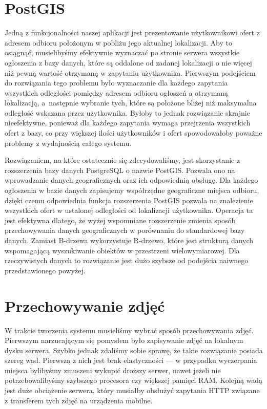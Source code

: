 \documentclass[licencjacka]{pracamgr}
\begin{document}
\section{PostGIS}
Jedną z funkcjonalności naszej aplikacji jest prezentowanie użytkownikowi ofert z adresem odbioru położonym w pobliżu jego aktualnej lokalizacji. Aby to osiągnąć, musielibyśmy efektywnie wyznaczać po stronie serwera wszystkie ogłoszenia z bazy danych, które są oddalone od zadanej lokalizacji o nie więcej niż pewną wartość otrzymaną w zapytaniu użytkownika. Pierwszym podejściem do rozwiązania tego problemu było wyznaczanie dla każdego zapytania wszystkich odległości pomiędzy adresem odbioru ogłoszeń a otrzymaną lokalizacją, a~następnie wybranie tych, które są położone bliżej niż maksymalna odległość wskazana przez użytkownika. Byłoby to jednak rozwiązanie skrajnie nieefektywne, ponieważ dla każdego zapytania wymaga przejrzenia wszystkich ofert z bazy, co przy większej ilości użytkowników i ofert spowodowałoby poważne problemy z wydajnością całego systemu.

Rozwiązaniem, na które ostatecznie się zdecydowaliśmy, jest skorzystanie z rozszerzenia bazy danych PostgreSQL o nazwie PostGIS\@. Pozwala ono na wprowadzanie danych geograficznych oraz ich odpowiednią obsługę. Dla każdego ogłoszenia w bazie danych zapisujemy współrzędne geograficzne miejsca odbioru, dzięki czemu odpowiednia funkcja rozszerzenia PostGIS pozwala na znalezienie wszystkich ofert w ustalonej odległości od lokalizacji użytkownika. Operacja ta jest efektywna dlatego, że wyżej wspomniane rozszerzenie zmienia sposób przechowywania danych geograficznych w porównaniu do standardowej bazy danych. Zamiast B-drzewa wykorzystuje R-drzewo, które jest strukturą danych wspomagającą wyszukiwanie obiektów w przestrzeni wielowymiarowej. Dla rzeczywistych danych to rozwiązanie jest dużo szybsze od podejścia naiwnego przedstawionego powyżej.

\section{Przechowywanie zdjęć}

W trakcie tworzenia systemu musieliśmy wybrać sposób przechowywania zdjęć. Pierwszym narzucającym się pomysłem było zapisywanie zdjęć na lokalnym dysku serwera. Szybko jednak zdaliśmy sobie sprawę, że takie rozwiązanie posiada szereg wad.
Pierwszą z nich jest brak elastyczności --- w przypadku wyczerpania miejsca bylibyśmy zmuszeni wykupić droższy serwer, nawet jeżeli nie potrzebowalibyśmy szybszego procesora czy większej pamięci RAM. Kolejną wadą jest duże obciążenie serwera, który musiałby obsłużyć zapytania HTTP związane z transferem tych zdjęć na urządzenia mobilne.
\end{document}
